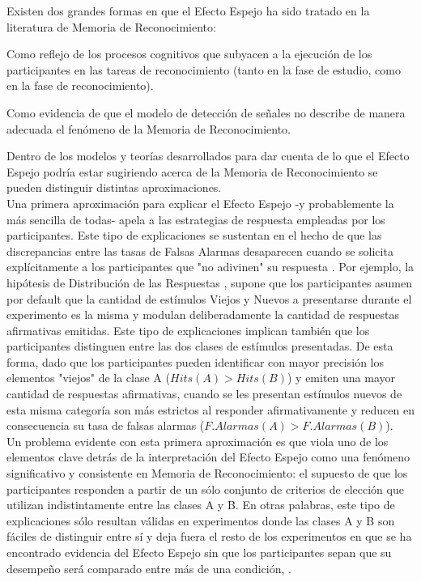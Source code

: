 Existen dos grandes formas en que el Efecto Espejo ha sido tratado en la literatura de Memoria de Reconocimiento:\\

\begin{numerate}
\item Como reflejo de los procesos cognitivos que subyacen a la ejecución de los participantes en las tareas de reconocimiento (tanto en la fase de estudio, como en la fase de reconocimiento).\\

\item Como evidencia de que el modelo de detección de señales no describe de manera adecuada el fenómeno de la Memoria de Reconocimiento.\\
\end{numerate}

Dentro de los modelos y teorías desarrollados para dar cuenta de lo que el Efecto Espejo podría estar sugiriendo acerca de la Memoria de Reconocimiento se pueden distinguir distintas aproximaciones.\\

Una primera aproximación para explicar el Efecto Espejo -y probablemente la más sencilla de todas- apela a las estrategias de respuesta empleadas por los participantes. Este tipo de explicaciones se sustentan en el hecho de que las discrepancias entre las tasas de Falsas Alarmas desaparecen cuando se solicita explícitamente a los participantes que "no adivinen" su respuesta \parencite{Greene1996}. Por ejemplo, la hipótesis de Distribución de las Respuestas \parencite{Greene1996}, supone que los participantes asumen por default que la cantidad de estímulos Viejos y Nuevos a presentarse durante el experimento es la misma y modulan deliberadamente la cantidad de respuestas afirmativas emitidas. Este tipo de explicaciones implican también que los participantes distinguen entre las dos clases de estímulos presentadas. De esta forma, dado que los participantes pueden identificar con mayor precisión los elementos "viejos" de la clase A ($Hits(A) > Hits(B)$) y emiten una mayor cantidad de respuestas afirmativas, cuando se les presentan estímulos nuevos de esta misma categoría son más estrictos al responder afirmativamente y reducen en consecuencia su tasa de falsas alarmas ($F.Alarmas(A) > F.Alarmas(B)$).\\

Un problema evidente con esta primera aproximación es que viola uno de los elementos clave detrás de la interpretación del Efecto Espejo como una fenómeno significativo y consistente en Memoria de Reconocimiento: el supuesto de que los participantes responden a partir de un sólo conjunto de criterios de elección que utilizan indistintamente entre las clases A y B. En otras palabras, este tipo de explicaciones sólo resultan válidas en experimentos donde las clases A y B son fáciles de distinguir entre sí y deja fuera el resto de los experimentos en que se ha encontrado evidencia del Efecto Espejo sin que los participantes sepan que su desempeño será comparado entre más de una condición, \parencite{Glanzer1998}.\\

